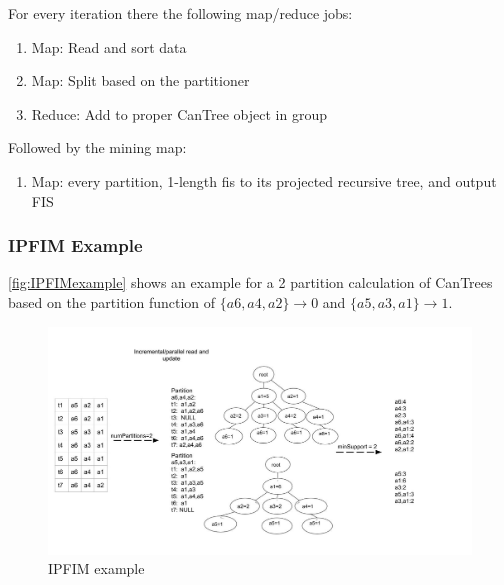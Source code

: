 For every iteration there the following map/reduce jobs:
\begin{enumerate}
\item Map: Read and sort data
\item Map: Split based on the partitioner
\item Reduce: Add to proper CanTree object in group
\end{enumerate}
Followed by the mining map:
\begin{enumerate}
\item Map: every partition, 1-length fis to its projected recursive tree, and output FIS
\end{enumerate}

\subsubsection{IPFIM Example}
 \autoref{fig:IPFIMexample} shows an example for a 2 partition calculation of CanTrees based on the partition function of $\{a6,a4,a2\}\to 0$ and $\{a5,a3,a1\}\to 1$.
\begin{figure}[H]
  \centering
  \includegraphics[width=\linewidth]{figures/IncrementalTreeMining1}
  \caption{IPFIM example}
  \label{fig:IPFIMexample}
\end{figure}



